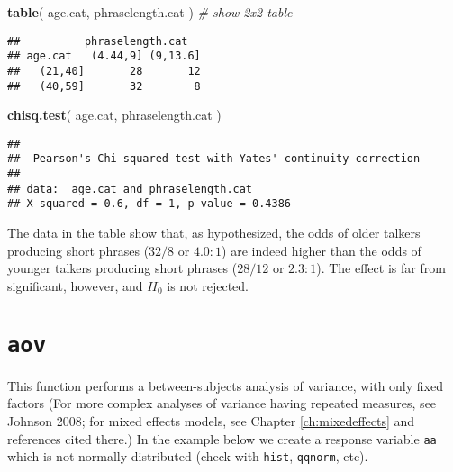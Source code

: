 \documentclass[]{book}
\newenvironment{Shaded}{\begin{snugshade}}{\end{snugshade}}
\newcommand{\CommentTok}[1]{\textcolor[rgb]{0.56,0.35,0.01}{\textit{#1}}}
\newcommand{\KeywordTok}[1]{\textcolor[rgb]{0.13,0.29,0.53}{\textbf{#1}}}
\newcommand{\NormalTok}[1]{#1}
\begin{document}
\begin{Shaded}
\begin{Highlighting}[]
\KeywordTok{table}\NormalTok{( age.cat, phraselength.cat ) }\CommentTok{# show 2x2 table}
\end{Highlighting}
\end{Shaded}

\begin{verbatim}
##          phraselength.cat
## age.cat   (4.44,9] (9,13.6]
##   (21,40]       28       12
##   (40,59]       32        8
\end{verbatim}

\begin{Shaded}
\begin{Highlighting}[]
\KeywordTok{chisq.test}\NormalTok{( age.cat, phraselength.cat ) }
\end{Highlighting}
\end{Shaded}

\begin{verbatim}
## 
##  Pearson's Chi-squared test with Yates' continuity correction
## 
## data:  age.cat and phraselength.cat
## X-squared = 0.6, df = 1, p-value = 0.4386
\end{verbatim}

The data in the table show that, as hypothesized, the odds of older talkers producing short phrases (\(32/8\) or \(4.0:1\)) are indeed higher than the odds of younger talkers producing short phrases (\(28/12\) or \(2.3:1\)). The effect is far from significant, however, and \(H_0\) is not rejected.

\hypertarget{aov}{%
\section{\texorpdfstring{\texttt{aov}}{aov}}\label{aov}}

This function performs a between-subjects analysis of variance, with
only fixed factors \citep{john08} (For more complex
analyses of variance having repeated measures, see Johnson 2008; for mixed effects models, see Chapter \ref{ch:mixedeffects} and references cited there.)
In the example below we create a
response variable \texttt{aa} which is not normally distributed
(check
with \texttt{hist}, \texttt{qqnorm}, etc).\\
\end{document}
